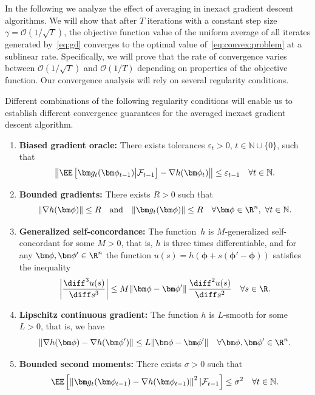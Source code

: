 \documentclass[11pt, a4paper, oneside, reqno]{article}
\begin{document}
	In the following we analyze the effect of averaging in inexact gradient descent algorithms. We will show that after $T$ iterations with a constant step size~$\gamma = \mathcal O(1 / \sqrt{T})$, the objective function value of the uniform average of all iterates generated by~\eqref{eq:gd} converges to the optimal value of~\eqref{eq:convex:problem} at a sublinear rate. Specifically, we will prove that the rate of convergence varies between $\mathcal{O}(1 / \sqrt{T})$ and $\mathcal{O}(1/T)$ depending on properties of the objective function.
	Our convergence analysis will rely on several regularity conditions.
	\begin{assumption} Different combinations of the following regularity conditions will enable us to establish different convergence guarantees for the averaged inexact gradient descent algorithm.
		\label{assumption:main}~
		\begin{enumerate}[label=(\roman*)]
			\item
			\textbf{Biased gradient oracle:}
			\label{assumption:main:gradients}
			There exists tolerances $\varepsilon_t>0$, $t\in\mathbb N\cup\{0\}$, such that
			\begin{align*} %
			\left\| \EE \left[ \bm g_t(\bm \phi_{t-1}) \big| \mathcal F_{t-1} \right] - \nabla h(\bm \phi_t) \right\|  \leq \varepsilon_{t-1}\quad \forall t\in\mathbb N.
			\end{align*}
			\item
			\textbf{Bounded gradients:}
			\label{assumption:main:bounded}
			There exists $R > 0$ such that
			$$ \| \nabla h(\bm \phi) \| \leq R\quad \text{and} \quad \| \bm g_t(\bm \phi) \| \leq R \quad \forall \bm \phi \in \R^n,~ \forall t \in \mathbb N.  $$
			\item
			\textbf{Generalized self-concordance:}
			\label{assumption:main:concordance}
			The function~$h$ is $M$-generalized self-concordant for some $M > 0$, that is, $h$ is three times differentiable, and for any $\bm \phi, \bm \phi' \in \R^n$ the function $u(s) = h(\bm \phi + s (\bm \phi' - \bm \phi))$ satisfies the inequality
			$$ \left| \frac{\diff^3 u(s)}{\diff s^3} \right| \leq M \| \bm \phi - \bm \phi' \| \, \frac{\diff^2 u(s)}{\diff s^2} \quad \forall s \in \R.$$
			\item
			\textbf{Lipschitz continuous gradient:}
			\label{assumption:main:smooth}
			The function $h$ is $L$-smooth for some $L > 0$, that is, we have
			$$ \| \nabla h(\bm \phi) - \nabla h(\bm \phi') \| \leq L \| \bm \phi - \bm \phi' \| \quad \forall \bm \phi, \bm \phi' \in \R^n. $$
			\item
			\textbf{Bounded second moments:}
			\label{assumption:main:moment}
			There exists $\sigma > 0$ such that
			\begin{align*}
			\EE \left[\left\| \bm g_t(\bm \phi_{t-1}) - \nabla h(\bm \phi_{t-1}) \right\|^2 | \mathcal F_{t-1} \right]  \leq \sigma^2 \quad \forall t \in \mathbb N.
			\end{align*}
		\end{enumerate}
	\end{assumption}
\end{document}
